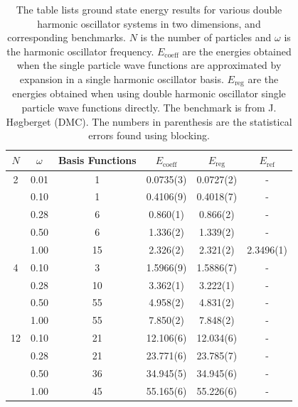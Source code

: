 \documentclass[../main.tex]{subfiles}
\begin{document}
\begin{table}[!ht]
  \centering
  \begin{tabular}{c c c c c c}
    \hline
    \hline
    $N$ & $\omega$ & Basis Functions & $E_\textrm{coeff}$ & $E_\textrm{reg}$ & $E_\textrm{ref}$ \\*
    \hline
    2 & 0.01 & 1 & 0.0735(3) & 0.0727(2) & - \\*
      & 0.10 & 1 & 0.4106(9) & 0.4018(7) & -  \\*
      & 0.28 & 6 & 0.860(1) & 0.866(2) & - \\*
      & 0.50 & 6 & 1.336(2) & 1.339(2) & - \\*
      & 1.00 & 15 & 2.326(2) & 2.321(2) & 2.3496(1) \vspace{2 mm}\\*
      
    4 & 0.10 & 3 & 1.5966(9) & 1.5886(7) & - \\*
      & 0.28 & 10 & 3.362(1) & 3.222(1) & - \\*
      & 0.50 & 55 & 4.958(2) & 4.831(2) & - \\*
      & 1.00 & 55 & 7.850(2) & 7.848(2) & - \vspace{2 mm}\\*
      
    12 & 0.10 & 21 & 12.106(6) & 12.034(6) & - \\*
       & 0.28 & 21 & 23.771(6) & 23.785(7) & - \\*
       & 0.50 & 36 & 34.945(5) & 34.945(6) & - \\*
       & 1.00 & 45 & 55.165(6) & 55.226(6) & - \\*
    \hline
    \hline
  \end{tabular}
  \caption{The table lists ground state energy results for various double harmonic oscillator systems in two dimensions, and corresponding benchmarks. $N$ is the number of particles and $\omega$ is the harmonic oscillator frequency. $E_\textrm{coeff}$ are the energies obtained when the single particle wave functions are approximated by expansion in a single harmonic oscillator basis. $E_\textrm{reg}$ are the energies obtained when using double harmonic oscillator single particle wave functions directly. The benchmark is from J. Høgberget \cite{Jorgen} (DMC). The numbers in parenthesis are the statistical errors found using blocking.}
  \label{tab: EnergiesDHO2D}
\end{table}
\end{document}
